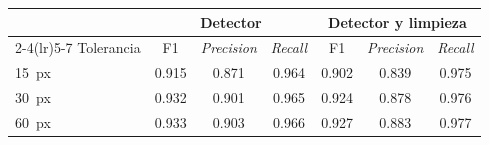 \begin{tabular}{lcccccc}
\toprule
& \multicolumn{3}{c}{Detector} & \multicolumn{3}{c}{Detector y limpieza} \\
\cmidrule(lr){2-4}\cmidrule(lr){5-7}
Tolerancia & F1 & \emph{Precision} & \emph{Recall} & F1 & \emph{Precision} & \emph{Recall} \\
\midrule
\SI{15}{px} & \num{0.915} & \num{0.871} & \num{0.964} & \num{0.902} & \num{0.839} & \num{0.975} \\
\SI{30}{px} & \num{0.932} & \num{0.901} & \num{0.965} & \num{0.924} & \num{0.878} & \num{0.976} \\
\SI{60}{px} & \num{0.933} & \num{0.903} & \num{0.966} & \num{0.927} & \num{0.883} & \num{0.977} \\
\bottomrule
\end{tabular}
